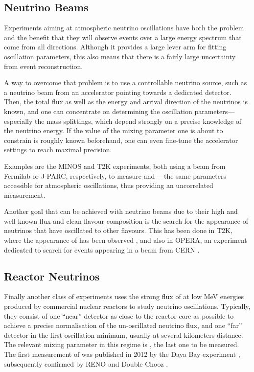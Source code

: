 \subsection{Neutrino Beams}

Experiments aiming at atmospheric neutrino oscillations have both the problem
and the benefit that they will observe events over a large energy spectrum that
come from all directions. Although it provides a large lever arm for fitting
oscillation parameters, this also means that there is a fairly large uncertainty
from event reconstruction.

A way to overcome that problem is to use a controllable neutrino source, such as
a neutrino beam from an accelerator pointing towards a dedicated detector. Then,
the total flux as well as the energy and arrival direction of the neutrinos is
known, and one can concentrate on determining the oscillation
parameters---especially the mass splittings, which depend strongly on a precise
knowledge of the neutrino energy. If the value of the mixing parameter one is
about to constrain is roughly known beforehand, one can even fine-tune the
accelerator settings to reach maximal precision.

Examples are the MINOS \cite{MINOSparams} and T2K \cite{T2Kparams} experiments,
both using a \numu beam from Fermilab or J-PARC, respectively, to measure
 and ---the same parameters accessible for atmospheric
oscillations, thus providing an uncorrelated measurement.

Another goal that can be achieved with neutrino beams due to their high and
well-known flux and clean flavour composition is the search for the appearance
of neutrinos that have oscillated to other flavours. This has been done in T2K,
where the appearance of \nue has been observed \cite{T2Kapp}, and also in
OPERA, an experiment dedicated to search for \nutau events appearing in a \numu
beam from CERN \cite{OPERAapp}.

\subsection{Reactor Neutrinos}

Finally another class of experiments uses the strong flux of \nuebar at low MeV
energies produced by commercial nuclear reactors to study neutrino
oscillations. Typically, they consist of one ``near'' detector as close to the
reactor core as possible to achieve a precise normalisation of the
un-oscillated neutrino flux, and one ``far'' detector in the first oscillation
minimum, usually at several kilometers distance.
The relevant mixing parameter in this regime is , the last one to be
measured. The first measurement of  was published in 2012 by the Daya
Bay experiment \cite{DayaBay}, subsequently confirmed by RENO and Double Chooz
\cite{RENO, DoubleChooz}.

